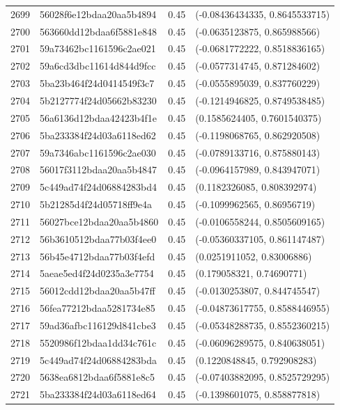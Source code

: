 \begin{table}[ht]
\begin{tabular}{rlrl}
  2699 & 56028f6e12bdaa20aa5b4894 & 0.45 & (-0.08436434335, 0.8645533715) \\ 
  2700 & 563660dd12bdaa6f5881e848 & 0.45 & (-0.0635123875, 0.865988566) \\ 
  2701 & 59a73462bc1161596c2ae021 & 0.45 & (-0.0681772222, 0.8518836165) \\ 
  2702 & 59a6cd3dbc11614d844d9fcc & 0.45 & (-0.0577314745, 0.871284602) \\ 
  2703 & 5ba23b464f24d0414549f3c7 & 0.45 & (-0.0555895039, 0.837760229) \\ 
  2704 & 5b2127774f24d05662b83230 & 0.45 & (-0.1214946825, 0.8749538485) \\ 
  2705 & 56a6136d12bdaa42423b4f1e & 0.45 & (0.1585624405, 0.7601540375) \\ 
  2706 & 5ba233384f24d03a6118ed62 & 0.45 & (-0.1198068765, 0.862920508) \\ 
  2707 & 59a7346abc1161596c2ae030 & 0.45 & (-0.0789133716, 0.875880143) \\ 
  2708 & 56017f3112bdaa20aa5b4847 & 0.45 & (-0.0964157989, 0.843947071) \\ 
  2709 & 5c449ad74f24d06884283bd4 & 0.45 & (0.1182326085, 0.808392974) \\ 
  2710 & 5b21285d4f24d05718ff9e4a & 0.45 & (-0.1099962565, 0.86956719) \\ 
  2711 & 56027bce12bdaa20aa5b4860 & 0.45 & (-0.0106558244, 0.8505609165) \\ 
  2712 & 56b3610512bdaa77b03f4ee0 & 0.45 & (-0.05360337105, 0.861147487) \\ 
  2713 & 56b45e4712bdaa77b03f4efd & 0.45 & (0.0251911052, 0.83006886) \\ 
  2714 & 5aeae5ed4f24d0235a3e7754 & 0.45 & (0.179058321, 0.74690771) \\ 
  2715 & 56012cdd12bdaa20aa5b47ff & 0.45 & (-0.0130253807, 0.844745547) \\ 
  2716 & 56fea77212bdaa5281734e85 & 0.45 & (-0.04873617755, 0.8588446955) \\ 
  2717 & 59ad36afbc116129d841cbe3 & 0.45 & (-0.05348288735, 0.8552360215) \\ 
  2718 & 5520986f12bdaa1dd34c761c & 0.45 & (-0.06096289575, 0.840638051) \\ 
  2719 & 5c449ad74f24d06884283bda & 0.45 & (0.1220848845, 0.792908283) \\ 
  2720 & 5638ea6812bdaa6f5881e8c5 & 0.45 & (-0.07403882095, 0.8525729295) \\ 
  2721 & 5ba233384f24d03a6118ed64 & 0.45 & (-0.1398601075, 0.858877818) \\ 

\end{tabular}
\end{table}
